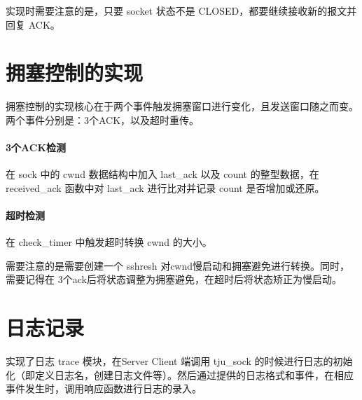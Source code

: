 实现时需要注意的是，只要 socket 状态不是 CLOSED，都要继续接收新的报文并回复 ACK。

\section{拥塞控制的实现}

拥塞控制的实现核心在于两个事件触发拥塞窗口进行变化，且发送窗口随之而变。两个事件分别是：3个ACK，以及超时重传。

\paragraph*{3个ACK检测} 在 sock 中的 cwnd 数据结构中加入 last\_ack 以及 count 的整型数据，在 received\_ack 函数中对 last\_ack 进行比对并记录 count 是否增加或还原。

\paragraph*{超时检测} 在 check\_timer 中触发超时转换 cwnd 的大小。

需要注意的是需要创建一个 sshresh 对cwnd慢启动和拥塞避免进行转换。同时，需要记得在 3个ack后将状态调整为拥塞避免，在超时后将状态矫正为慢启动。


\section*{日志记录}

实现了日志 trace 模块，在Server Client 端调用 tju\_sock 的时候进行日志的初始化（即定义日志名，创建日志文件等）。然后通过提供的日志格式和事件，在相应事件发生时，调用响应函数进行日志的录入。



